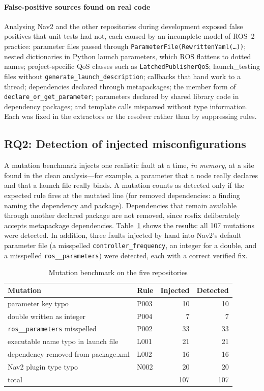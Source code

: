 ﻿\documentclass[conference]{IEEEtran}
\newcommand{\tool}{\textsf{rosfix}}
\newcommand{\code}[1]{\texttt{#1}}
\begin{document}
\paragraph{False-positive sources found on real code}
Analysing Nav2 and the other repositories during development exposed false positives that unit
tests had not, each caused by an incomplete model of ROS~2 practice: parameter files passed
through \code{ParameterFile(RewrittenYaml(\dots))}; nested dictionaries in Python launch
parameters, which ROS flattens to dotted names; project-specific QoS classes such as
\code{LatchedPublisherQoS}; launch\_testing files without \code{generate\_launch\_description};
callbacks that hand work to a thread; dependencies declared through metapackages; the member
form of \code{declare\_or\_get\_parameter}; parameters declared by shared library code in
dependency packages; and template calls misparsed without type information. Each was fixed in
the extractors or the resolver rather than by suppressing rules.

\subsection{RQ2: Detection of injected misconfigurations}

A mutation benchmark injects one realistic fault at a time, \emph{in memory}, at a site found
in the clean analysis---for example, a parameter that a node really declares and that a launch
file really binds. A mutation counts as detected only if the expected rule fires at the mutated
line (for removed dependencies: a finding naming the dependency and package). Dependencies that
remain available through another declared package are not removed, since \tool{} deliberately
accepts metapackage dependencies. Table~\ref{tab:mut} shows the results: all 107 mutations were
detected. In addition, three faults injected by hand into Nav2's default parameter file (a
misspelled \code{controller\_frequency}, an integer for a double, and a misspelled
\code{ros\_\_parameters}) were detected, each with a correct verified fix.

\begin{table}[t]
\centering
\caption{Mutation benchmark on the five repositories}
\label{tab:mut}
\footnotesize
\begin{tabular}{@{}llrr@{}}
\toprule
Mutation & Rule & Injected & Detected\\
\midrule
parameter key typo                   & P003 & 10 & 10\\
double written as integer            & P004 &  7 &  7\\
\code{ros\_\_parameters} misspelled  & P002 & 33 & 33\\
executable name typo in launch file  & L001 & 21 & 21\\
dependency removed from package.xml  & L002 & 16 & 16\\
Nav2 plugin type typo                & N002 & 20 & 20\\
\midrule
total                                &      & 107 & 107\\
\bottomrule
\end{tabular}
\end{table}
\end{document}
